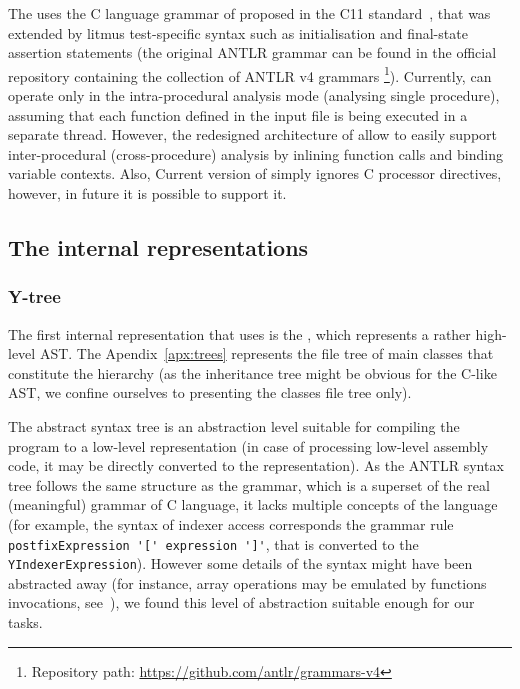 The \porthos[2] uses the C language grammar of proposed in the C11 standard~\cite{jtc2011sc22}, that was extended by litmus test-specific syntax such as initialisation and final-state assertion statements (the original ANTLR grammar can be found in the official repository containing the collection of ANTLR v4 grammars%
\footnote{Repository path: \url{https://github.com/antlr/grammars-v4}}).%
Currently, \porthos[2] can operate only in the intra-procedural analysis mode (analysing single procedure), assuming that each function defined in the input file is being executed in a separate thread.
However, the redesigned architecture of \porthos[2] allow to easily support inter-procedural (cross-procedure) analysis by inlining function calls and binding variable contexts.
Also, Current version of \porthos[2] simply ignores C processor directives, however, in future it is possible to support it.



\subsection{The internal representations}
\label{ch:impl:model}

\subsubsection{Y-tree}
\label{ch:impl:model:ytree}

The first internal representation that \porthos[2] uses is the \ytree{}, which represents a rather high-level AST.
The Apendix~\ref{apx:trees} represents the file tree of main classes that constitute the \ytree{} hierarchy (as the inheritance tree might be obvious for the C-like AST, we confine ourselves to presenting the classes file tree only).

The abstract syntax tree \ytree{} is an abstraction level suitable for compiling the program to a low-level representation (in case of processing low-level assembly code, it may be directly converted to the \xgraph{} representation).
As the ANTLR syntax tree follows the same structure as the grammar, which is a superset of the real (meaningful) grammar of C language, it lacks multiple concepts of the language (for example, the syntax of indexer access corresponds the grammar rule \lstinline{postfixExpression '[' expression ']'}, that is converted to the \texttt{YIndexerExpression}).
However some details of the syntax might have been abstracted away (for instance, array operations may be emulated by functions invocations, see~\cite[Chapter 5]{gries2012science}), we found this level of abstraction suitable enough for our tasks.

